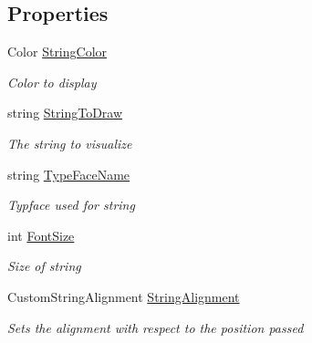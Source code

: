 \subsection*{Properties}
\begin{DoxyCompactItemize}
\item 
Color \hyperlink{class_w_p_f_visualization_base_1_1_drawing_object_string_ab08b77f72557649258dbd7841c5d13ce}{String\+Color}
\begin{DoxyCompactList}\small\item\em Color to display \end{DoxyCompactList}\item 
string \hyperlink{class_w_p_f_visualization_base_1_1_drawing_object_string_ac3fef1c8d40589ab0e7306399fabf4a7}{String\+To\+Draw}
\begin{DoxyCompactList}\small\item\em The string to visualize \end{DoxyCompactList}\item 
string \hyperlink{class_w_p_f_visualization_base_1_1_drawing_object_string_a84a168df70cd2db73b9bc73bcd3d026b}{Type\+Face\+Name}
\begin{DoxyCompactList}\small\item\em Typface used for string \end{DoxyCompactList}\item 
int \hyperlink{class_w_p_f_visualization_base_1_1_drawing_object_string_aec747f6f0f59a21ca124f46fdb0fac7e}{Font\+Size}
\begin{DoxyCompactList}\small\item\em Size of string \end{DoxyCompactList}\item 
Custom\+String\+Alignment \hyperlink{class_w_p_f_visualization_base_1_1_drawing_object_string_a56827b7acaa5459d27992d969ab00f18}{String\+Alignment}
\begin{DoxyCompactList}\small\item\em Sets the alignment with respect to the position passed \end{DoxyCompactList}\end{DoxyCompactItemize}
